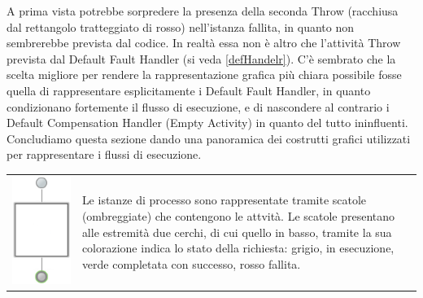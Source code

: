 A prima vista potrebbe sorpredere la presenza della seconda Throw (racchiusa
dal rettangolo tratteggiato di rosso) nell'istanza fallita, in quanto non
sembrerebbe prevista dal codice. In realtà essa non è altro che l'attività
Throw prevista dal Default Fault Handler (si veda \ref{defHandelr}). C'è
sembrato che la scelta migliore per rendere la rappresentazione grafica più chiara possibile fosse
quella di rappresentare esplicitamente i Default Fault Handler, in quanto
condizionano fortemente il flusso di esecuzione, e di nascondere al contrario i
Default Compensation Handler (Empty Activity) in quanto del tutto ininfluenti.
\\

Concludiamo questa sezione dando una panoramica dei costrutti grafici utilizzati
per rappresentare i flussi di esecuzione.
\vspace{0.3cm}

\begin{tabular}{cp{}}
\includegraphics[scale=0.48]{blide/dia/BlideInst} &
\parbox[b][4cm][t]{0.6 \textwidth}{Le istanze di processo
sono rappresentate tramite scatole (ombreggiate) che contengono le attvità.
Le scatole presentano alle estremità due cerchi, di cui quello in basso,
tramite la sua colorazione indica lo stato della richiesta: grigio, in
esecuzione, verde completata con successo, rosso fallita.}
\\
\end{tabular}

